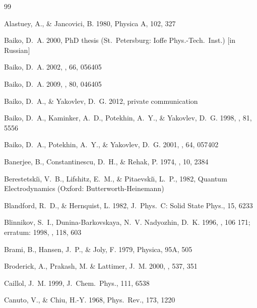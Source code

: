 \documentclass[traditabstract]{aa}
\begin{document}
\begin{thebibliography}{99}

Alastuey, A., \& Jancovici, B.
1980,
Physica A, 102, 327

Baiko, D.~A. 
2000,
PhD thesis (St.\ Petersburg: Ioffe Phys.-Tech.\ Inst.) [in Russian]

Baiko, D.~A. 
2002,
\pre, 66, 056405

Baiko, D.~A.
2009,
\pre, 80, 046405

Baiko, D.~A., \& Yakovlev, D.~G.
2012,
private communication

Baiko, D.~A., Kaminker, A.~D., Potekhin, A.~Y., \& Yakovlev, D.~G.
1998,
\prl, 81, 5556

Baiko, D.~A., Potekhin, A.~Y., \& Yakovlev, D.~G.
2001,
\pre, 64, 057402

Banerjee, B., Constantinescu, D.~H., \& Rehak, P.
1974,
\prd, 10, 2384

Berestetski{\u\i}, V.~B., Lifshitz, E.~M., \&
Pitaevski{\u\i}, L.~P.,
1982,
Quantum Electrodynamics
(Oxford: Butterworth-Heinemann)

Blandford, R.~D., \& Hernquist, L.
1982,
J.\ Phys.\ C: Solid State Phys., 15, 6233

Blinnikov, S.~I., Dunina-Barkovskaya,  N.~V. Nadyozhin, D.~K.
1996,
\apjs, {106} 171;
erratum: 1998, \apjs, 118, 603

Brami, B., Hansen, J.~P., \& Joly, F.
1979,
Physica, 95A, 505

Broderick, A., Prakash, M. \& Lattimer, J.~M.
2000,
\apj, 537, 351

Caillol, J.~M.
1999,
J.\ Chem.\ Phys., 111, 6538

Canuto, V., \& Chiu, H.-Y.
1968,
Phys.\ Rev., 173, 1220


\end{thebibliography}
\end{document}
